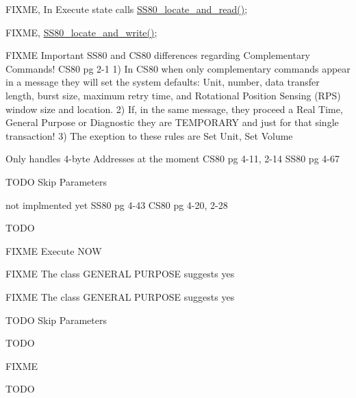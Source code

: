 \begin{DoxyRefList}
\label{todo__todo000015}%
%
F\+I\+X\+ME, In Execute state calls \mbox{\hyperlink{ss80_8c_acad6de863f4566b55cb8860eb1ffd09c}{S\+S80\+\_\+locate\+\_\+and\+\_\+read()}}; 

\label{todo__todo000016}%
%
F\+I\+X\+ME, \mbox{\hyperlink{ss80_8c_a41ef37ec5419463815401485cfcb62b1}{S\+S80\+\_\+locate\+\_\+and\+\_\+write()}}; 

\label{todo__todo000017}%
%
F\+I\+X\+ME Important S\+S80 and C\+S80 differences regarding Complementary Commands! C\+S80 pg 2-\/1 1) In C\+S80 when only complementary commands appear in a message they will set the system defaults\+: Unit, number, data transfer length, burst size, maximum retry time, and Rotational Position Sensing (R\+PS) window size and location. 2) If, in the same message, they proceed a Real Time, General Purpose or Diagnostic they are T\+E\+M\+P\+O\+R\+A\+RY and just for that single transaction! 3) The exeption to these rules are Set Unit, Set Volume 

\label{todo__todo000018}%
%
Only handles 4-\/byte Addresses at the moment C\+S80 pg 4-\/11, 2-\/14 S\+S80 pg 4-\/67 

\label{todo__todo000019}%
%
T\+O\+DO Skip Parameters 

\label{todo__todo000020}%
%
not implmented yet S\+S80 pg 4-\/43 C\+S80 pg 4-\/20, 2-\/28 

\label{todo__todo000021}%
%
T\+O\+DO 

\label{todo__todo000022}%
%
F\+I\+X\+ME Execute N\+OW 

\label{todo__todo000023}%
%
F\+I\+X\+ME The class G\+E\+N\+E\+R\+AL P\+U\+R\+P\+O\+SE suggests yes 

\label{todo__todo000024}%
%
F\+I\+X\+ME The class G\+E\+N\+E\+R\+AL P\+U\+R\+P\+O\+SE suggests yes 

\label{todo__todo000025}%
%
T\+O\+DO Skip Parameters 

\label{todo__todo000026}%
%
T\+O\+DO 

\label{todo__todo000027}%
%
F\+I\+X\+ME 

\label{todo__todo000028}%
%
T\+O\+DO 


\end{DoxyRefList}
